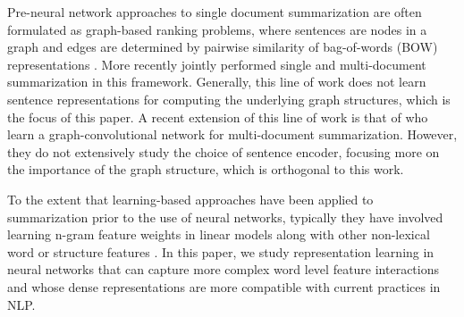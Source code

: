 
Pre-neural network
approaches to single document summarization
are often formulated as graph-based ranking problems, where
sentences are nodes in a graph and edges are determined by pairwise 
similarity of bag-of-words (BOW) representations 
\citep{erkan2004lexrank}.  %
More recently \citet{wan2010towards}
jointly performed single and multi-document summarization in this framework. 
Generally, this line of work does not learn sentence representations for 
computing the underlying graph structures, which is the focus of this paper.
%
A recent extension of this line of work is that of \citet{yasunaga2017graph}
who
learn a graph-convolutional network for
multi-document summarization. However, they do not extensively  study the 
choice of sentence encoder, focusing more on the importance of the 
graph structure, which is orthogonal to this work.

To the extent that learning-based approaches have been applied
to summarization prior to the use of neural networks, typically they have involved learning n-gram feature weights 
in linear models along with other non-lexical word or 
structure features 
\cite{berg2011jointly,sipos2012large,durrett2016learning}.
In this paper, we study representation learning in
neural networks that can capture more complex word level feature interactions
and whose dense representations are more compatible with current practices
in NLP.

